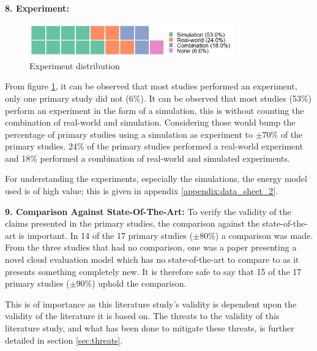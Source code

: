 \vspace{5mm}

\noindent\textbf{8. Experiment:}
\begin{figure}
    \includegraphics[width=250pt]{figures/waffle_exp_freq.png}
    \caption{Experiment distribution}
    \label{fig:experiment_distr}
\end{figure}
From figure \ref{fig:experiment_distr}, it can be observed that most studies performed an experiment, only one primary study did not (6\%).
It can be observed that most studies (53\%) perform an experiment in the form of a simulation, 
this is without counting the combination of real-world and simulation.
Considering those would bump the percentage of primary studies using a simulation as experiment to $\pm 70\%$ of the primary studies.
24\% of the primary studies performed a real-world experiment and 18\% performed a combination of real-world and simulated experiments.

\vspace{2mm}

For understanding the experiments, especially the simulations, the energy model used is of high value; this is given in appendix \ref{appendix:data_sheet_2}.

\vspace{5mm}

\noindent\textbf{9. Comparison Against State-Of-The-Art:}
To verify the validity of the claims presented in the primary studies, the comparison against the state-of-the-art is important.
In 14 of the 17 primary studies ($\pm 80\%$) a comparison was made.
From the three studies that had no comparison, one was a paper presenting a novel cloud evaluation model \cite{hou2017novel_cloud_evaluation_model}
which has no state-of-the-art to compare to as it presents something completely new. 
It is therefore safe to say that 15 of the 17 primary studies ($\pm 90\%$) uphold the comparison.

\vspace{2mm}

\noindent This is of importance as this literature study's validity is dependent upon the validity of the literature it is based on.
The threats to the validity of this literature study, and what has been done to mitigate these threats,
is further detailed in section \ref{sec:threats}.

